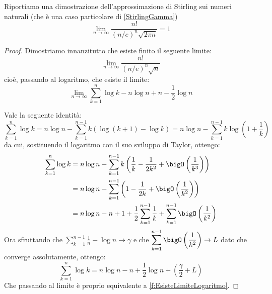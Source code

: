 \begin{theorem}\label{f:StirlingNaturali}
	Riportiamo una dimostrazione dell'approssimazione di Stirling sui numeri naturali (che è una caso
	particolare di \cref{StirlingGamma})
	\begin{equation*}
		\lim_{n\to\infty}{\frac{n!}{(n/e)^n\sqrt{2\pi n}}}=1
	\end{equation*}
\end{theorem}
\begin{proof}
	Dimostriamo innanzitutto che esiste finito il seguente limite:
	\begin{equation}\label{f:EsisteLimite}
		\lim_{n\to\infty}{\frac{n!}{(n/e)^n\sqrt{n}}}
	\end{equation}
	cioè, passando al logaritmo, che esiste il limite:
	\begin{equation}\label{f:EsisteLimiteLogaritmo}
		\lim_{n\to\infty}{\sum_{k=1}^{n}\log k-n\log n+n-\frac{1}{2}\log n}
	\end{equation}
	
	Vale la seguente identità:
	\begin{equation*}
		\sum_{k=1}^{n}\log k=n\log n-\sum_{k=1}^{n-1}{k\left(\log(k+1)-\log k \right)}=n\log n-\sum_{k=1}^{n-1}{k\log\left(1+\frac{1}{k}\right)}
	\end{equation*}
	da cui, sostituendo il logaritmo con il suo sviluppo di Taylor, ottengo:
	\begin{equation*}
	\begin{split}
		\sum_{k=1}^{n}\log k	& =n\log n-\sum_{k=1}^{n-1}{k\left(\frac{1}{k}-\frac{1}{2k^2}+\bigO\left(\frac{1}{k^3}\right) \right)}\\
							& =n\log n-\sum_{k=1}^{n-1}\left(1-\frac{1}{2k}+\bigO\left(\frac{1}{k^2}\right)  \right)\\
							& =n\log n-n+1+\frac{1}{2}\sum_{k=1}^{n-1}\frac{1}{k}+\sum_{k=1}^{n-1}\bigO\left(\frac{1}{k^2}\right)
	\end{split}
	\end{equation*}
	Ora sfruttando che $\displaystyle \sum_{k=1}^{n-1}\frac{1}{n}-\log n\to \gamma$ e che $\displaystyle \sum_{k=1}^{n-1}\bigO\left(\frac{1}{k^2}\right)\to L$
	dato che converge assolutamente, ottengo:
	\begin{equation}\label{f:QuasiStirlingNaturali}
		\sum_{k=1}^{n}\log k=n\log n-n+\frac{1}{2}\log n + \left(\frac{\gamma}2 + L\right)
	\end{equation}
	Che passando al limite è proprio equivalente a \cref{f:EsisteLimiteLogaritmo}.
	

\end{proof}
